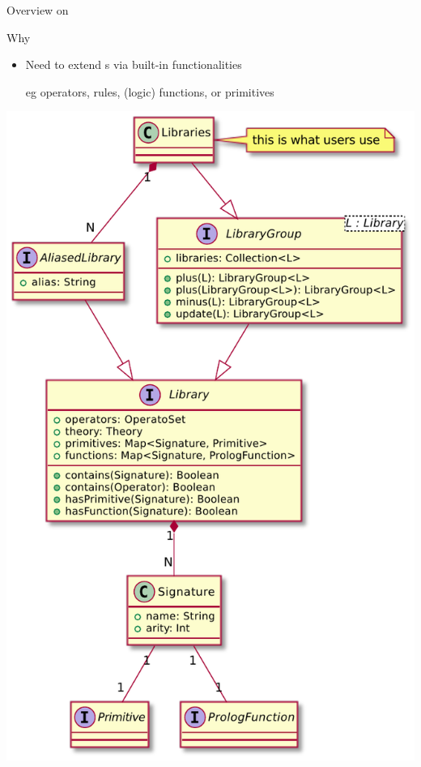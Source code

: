 \documentclass[handout]{beamer}
\begin{document}
\begin{frame}[allowframebreaks]{Overview on }
    \begin{block}{Why }
        \begin{itemize}
            \item Need to extend s via built-in functionalities
            \item[eg] operators, rules, (logic) functions, or primitives
        \end{itemize}
    \end{block}

    \framebreak

    \begin{center}
        \includegraphics[height=.75\textheight]{img/libraries.pdf}
    \end{center}


\end{frame}
\end{document}
